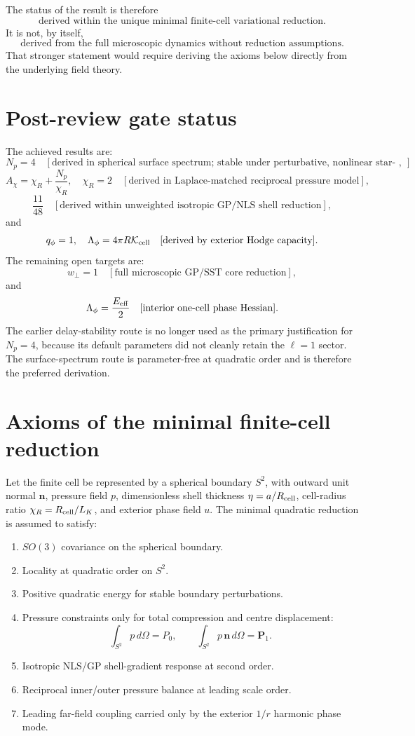 \documentclass[11pt]{article}
\begin{document}
The status of the result is therefore
\[
  \boxed{\text{derived within the unique minimal finite-cell variational reduction}.}
\]
It is not, by itself,
\[
  \boxed{\text{derived from the full microscopic dynamics without reduction assumptions}.}
\]
That stronger statement would require deriving the axioms below directly from
the underlying field theory.


\section{Post-review gate status}

The achieved results are:
\[
  N_p=4
  \quad [\text{derived in spherical surface spectrum; stable under perturbative, nonlinear star-shaped, and finite-perimeter global-topology checks}],
\]
\[
  A_\chi=\chi_R+\frac{N_p}{\chi_R},\quad \chi_R=2
  \quad [\text{derived in Laplace-matched reciprocal pressure model}],
\]
\[
  \frac{11}{48}
  \quad [\text{derived within unweighted isotropic GP/NLS shell reduction}],
\]
and
\[
  q_\phi=1,\quad \Lambda_\phi=4\pi R\mathcal K_{\rm cell}
  \quad [\text{derived by exterior Hodge capacity}].
\]
The remaining open targets are:
\[
  w_\perp=1
  \quad [\text{full microscopic GP/SST core reduction}],
\]
and
\[
  \Lambda_\phi=\frac{E_{\rm eff}}{2}
  \quad [\text{interior one-cell phase Hessian}].
\]
The earlier delay-stability route is no longer used as the primary justification
for \(N_p=4\), because its default parameters did not cleanly retain the
\(\ell=1\) sector.  The surface-spectrum route is parameter-free at quadratic
order and is therefore the preferred derivation.

\section{Axioms of the minimal finite-cell reduction}

Let the finite cell be represented by a spherical boundary \(S^2\), with
outward unit normal \(\mathbf n\), pressure field \(p\), dimensionless shell
thickness \(\eta=a/R_{\rm cell}\), cell-radius ratio
\(\chi_R=R_{\rm cell}/L_K\), and exterior phase field \(u\).  The minimal
quadratic reduction is assumed to satisfy:
\begin{enumerate}[label=A\arabic*.]
\item \(SO(3)\) covariance on the spherical boundary.
\item Locality at quadratic order on \(S^2\).
\item Positive quadratic energy for stable boundary perturbations.
\item Pressure constraints only for total compression and centre displacement:
\[
  \int_{S^2}p\,d\Omega=P_0,\qquad
  \int_{S^2}p\,\mathbf n\,d\Omega=\mathbf P_1.
\]
\item Isotropic NLS/GP shell-gradient response at second order.
\item Reciprocal inner/outer pressure balance at leading scale order.
\item Leading far-field coupling carried only by the exterior \(1/r\) harmonic
phase mode.
\end{enumerate}
\end{document}
